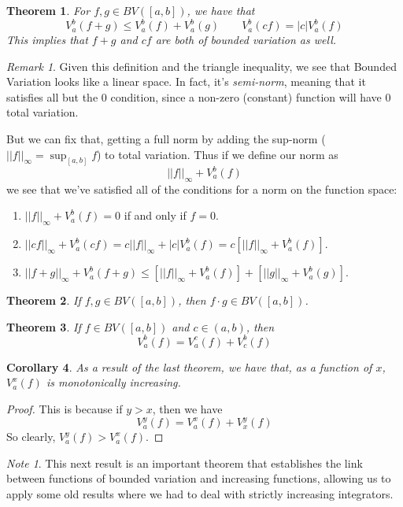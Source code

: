 \documentclass[12pt]{article}
\theoremstyle{plain}
\newtheorem{thm}{Theorem}[subsection]
\newtheorem{cor}[thm]{Corollary}
\theoremstyle{definition}
\theoremstyle{remark}
\newtheorem*{rmk}{Remark}
\newtheorem*{note}{Note}
\begin{document}
\begin{thm}
For $f, g\in BV([a,b])$, we have that
    \[ V_a^b(f+g) \leq V_a^b(f) + V_a^b(g)
    \qquad V_a^b(cf) = |c|V_a^b(f) \]
This implies that $f+g$ and $cf$ are both of bounded variation as well.
\end{thm}
\begin{rmk}
Given this definition and the triangle inequality, we see that Bounded Variation looks like a linear space. In fact, it's \emph{semi-norm}, meaning that it satisfies all but the 0 condition, since a non-zero (constant) function will have 0 total variation. 

But we can fix that, getting a full norm by adding the sup-norm ($||f||_\infty = \sup_{[a,b]} f$) to total variation. Thus if we define our norm as
    \[ ||f||_\infty + V_a^b(f) \]
we see that we've satisfied all of the conditions for a norm on the function space:
\begin{enumerate}
    \item $||f||_\infty + V_a^b(f) = 0$ if and only if $f=0$.
    \item $||cf||_\infty + V_a^b(cf) = c||f||_\infty + |c|V_a^b(f)
        = c\left[||f||_\infty + V_a^b(f)\right]$.
    \item $||f+g||_\infty + V_a^b(f+g) \leq 
        \left[||f||_\infty + V_a^b(f)\right] +
        \left[||g||_\infty + V_a^b(g)\right]$.
\end{enumerate}
\end{rmk}

\begin{thm}
If $f,g\in BV([a,b])$, then $f\cdot g \in BV([a,b])$.
\end{thm}

\begin{thm}
If $f\in BV([a,b])$ and $c \in (a,b)$, then 
    \[ V_a^b(f) = V_a^c(f) + V_c^b(f) \]
\end{thm}
\begin{cor}
As a result of the last theorem, we have that, as a function of $x$, $V_a^x(f)$ is monotonically increasing.
\end{cor}
\begin{proof}
This is because if $y>x$, then we have 
    \[ V_a^y(f) = V_a^x(f) + V_x^y(f) \]
So clearly, $V_a^y(f) >V_a^x(f)$.
\end{proof}

\begin{note}
This next result is an important theorem that establishes the link between functions of bounded variation and increasing functions, allowing us to apply some old results where we had to deal with strictly increasing integrators.
\end{note}
\end{document}

